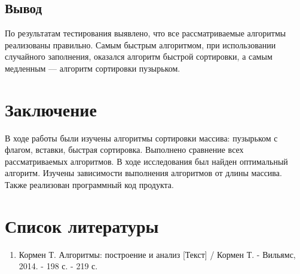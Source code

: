 \documentclass[12pt]{report}
\begin{document}
\section{Вывод}
По результатам тестирования выявлено, что все рассматриваемые алгоритмы реализованы правильно. Самым быстрым алгоритмом, при использовании случайного заполнения, оказался алгоритм быстрой сортировки, а самым медленным — алгоритм сортировки пузырьком.

\chapter*{Заключение}
В ходе работы были изучены алгоритмы сортировки массива: пузырьком с флагом, вставки, быстрая сортировка. Выполнено сравнение всех рассматриваемых алгоритмов. В ходе исследования был найден оптимальный алгоритм. Изучены зависимости выполнения алгоритмов от длины массива. Также реализован программный код продукта.


\chapter*{Список литературы}
\begin{enumerate}
	\item Кормен Т. Алгоритмы: построение и анализ [Текст] / Кормен Т. - Вильямс, 2014. - 198 с. - 219 с.
\end{enumerate}
\end{document}
